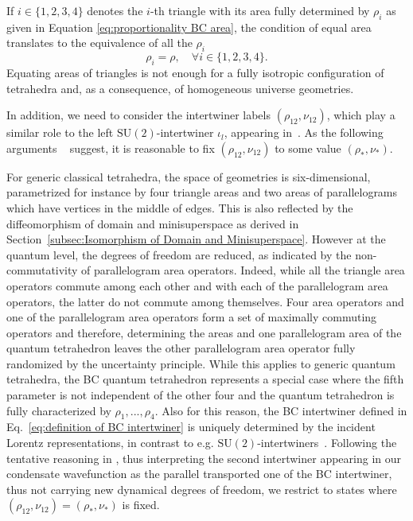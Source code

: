 \documentclass[11pt,a4paper]{article}
\newcommand{\SU}{\text{SU$(2)$}}
\begin{document}
If $i\in\{1,2,3,4\}$ denotes the $i$-th triangle with its area fully determined by $\rho_i$ as given in Equation \eqref{eq:proportionality BC area}, the condition of equal area translates to the equivalence of all the $\rho_i$
%
\begin{equation}
\rho_i = \rho,\quad\forall i\in\{1,2,3,4\}.
\end{equation}
%
Equating areas of triangles is not enough for a fully isotropic configuration of tetrahedra and, as a consequence, of homogeneous universe geometries.

In addition, we need to consider the intertwiner labels $(\rho_{12},\nu_{12})$, which play a similar role to the left $\SU$-intertwiner $\iota_l$, appearing in~\cite{Oriti:2016qtz,deCesare:2017ynn}. As the following arguments ~\cite{Baez:1999tk,Oriti:2003wf} suggest, it is reasonable to fix $(\rho_{12},\nu_{12})$ to some value $(\rho_*,\nu_*)$.

For generic classical tetrahedra, the space of geometries is six-dimensional, parametrized for instance by four triangle areas and two areas of parallelograms which have vertices in the middle of edges.  This is also reflected by the diffeomorphism of domain and minisuperspace as derived in Section~\ref{subsec:Isomorphism of Domain and Minisuperspace}. However at the quantum level, the degrees of freedom are reduced, as indicated by the non-commutativity of parallelogram area operators. Indeed, while all the triangle area operators commute among each other and with each of the parallelogram area operators, the latter do not commute among themselves. Four area operators and one of the parallelogram area operators form a set of maximally commuting operators and therefore, determining the areas and one parallelogram area of the quantum tetrahedron leaves the other parallelogram area operator fully randomized by the uncertainty principle. While this applies to generic quantum tetrahedra, the BC quantum tetrahedron represents a special case where the fifth parameter is not independent of the other four and the quantum tetrahedron is fully characterized by $\rho_1,...,\rho_4$. Also for this reason, the BC intertwiner defined in Eq.~\eqref{eq:definition of BC intertwiner} is uniquely determined by the incident Lorentz representations, in contrast to e.g. $\SU$-intertwiners~\cite{Rovelli:2014ssa}. 
Following the tentative reasoning in \cite{Oriti:2016qtz}, thus interpreting the second intertwiner appearing in our condensate wavefunction as the parallel transported one of the BC intertwiner, thus not carrying new dynamical degrees of freedom, we restrict to states where $(\rho_{12},\nu_{12}) = (\rho_*,\nu_*)$ is fixed.
\end{document}
